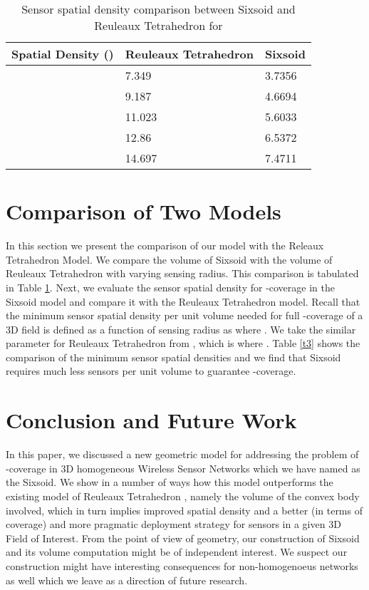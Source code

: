 \documentclass[conference]{IEEEtran}
\begin{document}
\begin{table}
\small
 \caption{Sensor spatial density comparison between Sixsoid and Reuleaux Tetrahedron for }
\label{t2}
\begin{center}
    \begin{tabular}{ | l | l | l |}
    \hline
    Spatial Density ()  & Reuleaux Tetrahedron & Sixsoid  \\ \hline
      &7.349 &  3.7356   \\ \hline          
      &9.187 & 4.6694  \\ \hline
      &11.023 & 5.6033  \\ \hline
      &12.86 & 6.5372  \\ \hline
      &14.697 & 7.4711  \\ \hline
    \end{tabular}
\end{center}
\end{table}


\section{Comparison of Two Models}
In this section we present the comparison of our model with the Releaux Tetrahedron Model.
We compare the volume of Sixsoid with the volume of Reuleaux Tetrahedron with varying sensing radius. This comparison is tabulated in Table \ref{t2}. Next, we evaluate the sensor spatial density for -coverage in the Sixsoid model and compare it with the Reuleaux Tetrahedron model. Recall that the minimum sensor spatial density per unit volume needed for full -coverage of a 3D field is defined as a function of sensing radius  as  where . We take the similar parameter for Reuleaux Tetrahedron from \cite{A,AD1}, which is  where . Table \ref{t3} shows the comparison of the minimum sensor spatial densities and we find that Sixsoid requires much less sensors per unit volume to guarantee -coverage.   


\section{Conclusion and Future Work}
In this paper, we discussed a new geometric model for addressing the 
problem of -coverage in 3D homogeneous Wireless Sensor Networks
which we have named as the Sixsoid. We show
in a number of ways how this model outperforms the existing model of Reuleaux 
Tetrahedron \cite{A,AD1}, namely the volume of the convex body involved,
which in turn implies improved spatial density and a better (in terms of coverage)
and more pragmatic deployment strategy for sensors in a given 3D Field of Interest. 
From the point of view of geometry, our construction of Sixsoid and its volume computation 
might be of independent interest. We suspect our construction might have interesting
consequences for non-homogenoeus networks as well which we leave as a direction of future research. 
   
\end{document}
